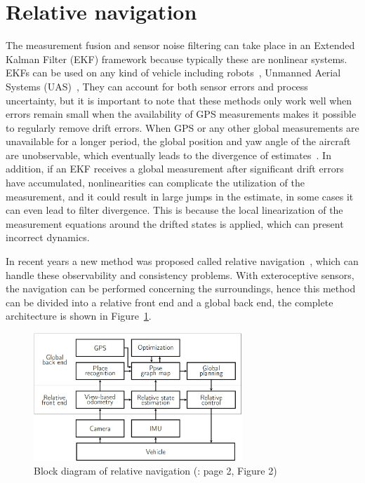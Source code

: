 \section{Relative navigation}

The measurement fusion and sensor noise filtering can take place in an Extended Kalman Filter (EKF) framework because typically these are nonlinear systems. EKFs can be used on any kind of vehicle including robots~\cite{EKF-Robot}, Unmanned Aerial Systems (UAS)~\cite{EKF-UAS-1, EKF-UAS-2}, \etc{} They can account for both sensor errors and process uncertainty, but it is important to note that these methods only work well when errors remain small \eg{} when the availability of GPS measurements makes it possible to regularly remove drift errors. When GPS or any other global measurements are unavailable for a longer period, the global position and yaw angle of the aircraft are unobservable, which eventually leads to the divergence of estimates~\cite{unobservable-1, unobservable-2}. In addition, if an EKF receives a global measurement after significant drift errors have accumulated, nonlinearities can complicate the utilization of the measurement, and it could result in large jumps in the estimate, in some cases it can even lead to filter divergence. This is because the local linearization of the measurement equations around the drifted states is applied, which can present incorrect dynamics.

In recent years a new method was proposed called relative navigation~\cite{rel-nav-1, rel-nav-2}, which can handle these observability and consistency problems. With exteroceptive sensors, the navigation can be performed concerning the surroundings, hence this method can be divided into a relative front end and a global back end, the complete architecture is shown in Figure~\ref{fig:real-nav}. 

\begin{figure}[H]
    \centering
    \includegraphics[width=0.7\textwidth]{figures/rel-nav}
    \caption{Block diagram of relative navigation (\cite{rel-nav}: page 2, Figure 2)}\label{fig:real-nav}
\end{figure}

